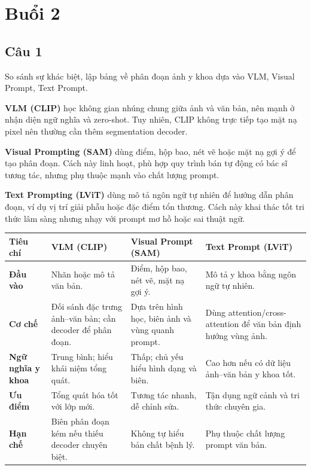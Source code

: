 \chapter{Buổi 2}
\label{Chapter2}
\setcounter{secnumdepth}{5}

\section*{Câu 1}
So sánh sự khác biệt, lập bảng về phân đoạn ảnh y khoa dựa vào VLM, Visual Prompt, Text Prompt.

\textbf{VLM (CLIP)} học không gian nhúng chung giữa ảnh và văn bản, nên mạnh ở nhận diện ngữ nghĩa và zero-shot. Tuy nhiên, CLIP không trực tiếp tạo mặt nạ pixel nên thường cần thêm segmentation decoder.

\textbf{Visual Prompting (SAM)} dùng điểm, hộp bao, nét vẽ hoặc mặt nạ gợi ý để tạo phân đoạn. Cách này linh hoạt, phù hợp quy trình bán tự động có bác sĩ tương tác, nhưng phụ thuộc mạnh vào chất lượng prompt.

\textbf{Text Prompting (LViT)} dùng mô tả ngôn ngữ tự nhiên để hướng dẫn phân đoạn, ví dụ vị trí giải phẫu hoặc đặc điểm tổn thương. Cách này khai thác tốt tri thức lâm sàng nhưng nhạy với prompt mơ hồ hoặc sai thuật ngữ.

\small
\begin{longtable}{|p{}|p{}|p{}|p{}|}
\hline
\textbf{Tiêu chí} & \textbf{VLM (CLIP)} & \textbf{Visual Prompt (SAM)} & \textbf{Text Prompt (LViT)} \\
\hline
\textbf{Đầu vào} & Nhãn hoặc mô tả văn bản. & Điểm, hộp bao, nét vẽ, mặt nạ gợi ý. & Mô tả y khoa bằng ngôn ngữ tự nhiên. \\
\hline
\textbf{Cơ chế} & Đối sánh đặc trưng ảnh--văn bản; cần decoder để phân đoạn. & Dựa trên hình học, biên ảnh và vùng quanh prompt. & Dùng attention/cross-attention để văn bản định hướng vùng ảnh. \\
\hline
\textbf{Ngữ nghĩa y khoa} & Trung bình; hiểu khái niệm tổng quát. & Thấp; chủ yếu hiểu hình dạng và biên. & Cao hơn nếu có dữ liệu ảnh--văn bản y khoa tốt. \\
\hline
\textbf{Ưu điểm} & Tổng quát hóa tốt với lớp mới. & Tương tác nhanh, dễ chỉnh sửa. & Tận dụng ngữ cảnh và tri thức chuyên gia. \\
\hline
\textbf{Hạn chế} & Biên phân đoạn kém nếu thiếu decoder chuyên biệt. & Không tự hiểu bản chất bệnh lý. & Phụ thuộc chất lượng prompt văn bản. \\
\hline
\end{longtable}
\normalsize

